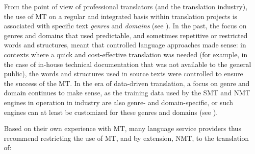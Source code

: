 \documentclass[output=paper,colorlinks,citecolor=brown,
]{langscibook}
\begin{document}
From the point of view of professional translators (and the translation industry), the use of MT on a regular and integrated basis within translation projects is associated with specific text \textit{genres} and \textit{domains} (see ). In the past, the focus on genres and domains that used predictable, and sometimes repetitive or restricted words and structures, meant that controlled language approaches made sense: in contexts where a quick and cost-effective translation was needed (for example, in the case of in-house technical documentation that was not available to the general public), the words and structures used in source texts were controlled to ensure the success of the MT. In the era of data-driven translation, a focus on genre and domain continues to make sense, as the training data used by the SMT and NMT engines in operation in industry are also genre- and domain-specific, or such engines can at least be customized for these genres and domains (see ).

Based on their own experience with MT, many language service providers thus recommend restricting the use of MT, and by extension, NMT, to the translation of:
\end{document}
